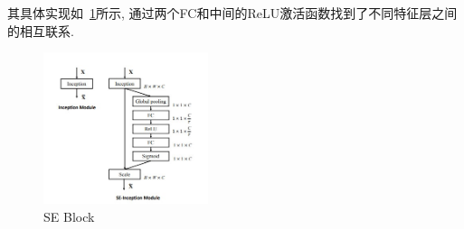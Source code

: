 其具体实现如~\ref{fig:0103}所示, 通过两个FC和中间的ReLU激活函数找到了不同特征层之间的相互联系. 
\begin{figure}[!htbp]
    \centering
    \includegraphics[height=12em]{pic/pic0103.jpg}
    \caption{SE Block}
    \label{fig:0103}
\end{figure}


